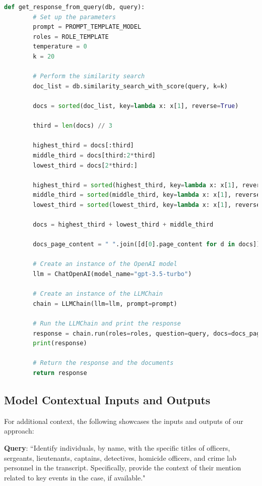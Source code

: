\documentclass{article}
\begin{document}
\begin{lstlisting}[language=Python, caption=Code Snippet 4, breaklines=true]
    def get_response_from_query(db, query):
        # Set up the parameters
        prompt = PROMPT_TEMPLATE_MODEL
        roles = ROLE_TEMPLATE
        temperature = 0
        k = 20
    
        # Perform the similarity search
        doc_list = db.similarity_search_with_score(query, k=k)
    
        docs = sorted(doc_list, key=lambda x: x[1], reverse=True)
    
        third = len(docs) // 3
    
        highest_third = docs[:third]
        middle_third = docs[third:2*third]
        lowest_third = docs[2*third:]
    
        highest_third = sorted(highest_third, key=lambda x: x[1], reverse=True)
        middle_third = sorted(middle_third, key=lambda x: x[1], reverse=True)
        lowest_third = sorted(lowest_third, key=lambda x: x[1], reverse=True)
    
        docs = highest_third + lowest_third + middle_third
    
        docs_page_content = " ".join([d[0].page_content for d in docs])
    
        # Create an instance of the OpenAI model
        llm = ChatOpenAI(model_name="gpt-3.5-turbo")
    
        # Create an instance of the LLMChain
        chain = LLMChain(llm=llm, prompt=prompt)
    
        # Run the LLMChain and print the response
        response = chain.run(roles=roles, question=query, docs=docs_page_content, temperature=temperature)
        print(response)
    
        # Return the response and the documents
        return response
\end{lstlisting}

\subsection{Model Contextual Inputs and Outputs}

For additional context, the following showcases the inputs and outputs of our approach:

\noindent \textbf{Query}:  
``Identify individuals, by name, with the specific titles of officers, sergeants, lieutenants, captains, detectives, homicide officers, and crime lab personnel in the transcript. Specifically, provide the context of their mention related to key events in the case, if available."
\end{document}
